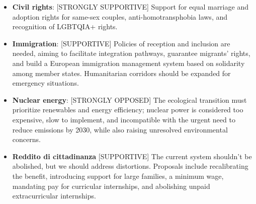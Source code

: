 
\begin{tcolorbox}[prompt]
\begin{itemize}
    \item \textbf{Civil rights}:
        [STRONGLY SUPPORTIVE] Support for equal marriage and adoption rights for same-sex couples, anti-homotransphobia laws, and recognition of LGBTQIA+ rights. 
    \item \textbf{Immigration}:
        [SUPPORTIVE] Policies of reception and inclusion are needed, aiming to facilitate integration pathways, guarantee migrants' rights, and build a European immigration management system based on solidarity among member states. Humanitarian corridors should be expanded for emergency situations.
    \item \textbf{Nuclear energy}: 
        [STRONGLY OPPOSED] The ecological transition must prioritize renewables and energy efficiency; nuclear power is considered too expensive, slow to implement, and incompatible with the urgent need to reduce emissions by 2030, while also raising unresolved environmental concerns.
    \item \textbf{Reddito di cittadinanza}
        [SUPPORTIVE] The current system shouldn't be abolished, but we should address distortions. Proposals include recalibrating the benefit, introducing support for large families, a minimum wage, mandating pay for curricular internships, and abolishing unpaid extracurricular internships.
\end{itemize}
\end{tcolorbox}